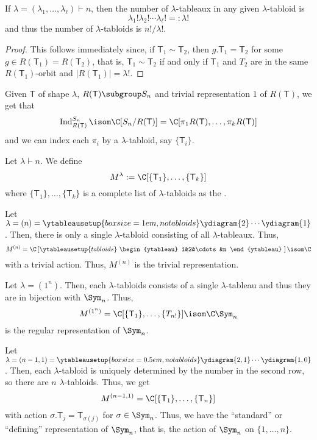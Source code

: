 \documentclass[11pt,leqno,oneside]{amsbook}
\newcommand{\Ind}{\operatorname{Ind}}
\newcommand{\partitionof}{\vdash}
\newcommand{\T}{\mathsf{T}} %
\numberwithin{thm}{section}
\begin{document}
\begin{prop}
  If \(\lambda = (\lambda_1, \ldots, \lambda_\ell) \partitionof n\), then the number of \(\lambda\)-tableaux in any
  given \(\lambda\)-tabloid is \[
    \lambda_1 ! \lambda_2 ! \cdots \lambda_\ell ! =: \lambda!
  \]
  and thus the number of \(\lambda\)-tabloids is \(n!/\lambda!\).
\end{prop}
\begin{proof}
  This follows immediately since, if \(\T_1 \sim \T_2\), then \(g.\T_1
  = \T_2\) for some \(g \in R(\T_1) = R(\T_2)\), that is, \(\T_1 \sim
  \T_2\) if and only if \(\T_1\) and \(T_2\) are in the same
  \(R(\T_1)\)-orbit and \(|R(\T_1)| = \lambda!\). 
\end{proof}
\begin{prop}
  Given \(\T\) of shape \(\lambda\), \(R(\T) \subgroup S_n\) and
  trivial representation \(1\) of 
  \(R(\T)\), we get that \[ 
    \Ind_{R(\T)}^{S_n} \isom \C[S_n/R(\T)] = \C[\pi_1 R(\T), \ldots,
    \pi_k R(\T)]
  \]
  and we can index each \(\pi_i\) by a \(\lambda\)-tabloid, say
  \(\{\T_i\}\).
\end{prop}
\begin{defn}
  Let \(\lambda \partitionof n\). We define \[
    M^\lambda := \C[\{\T_1\}, \ldots, \{\T_k\}]
  \]
  where \(\{\T_1\}, \ldots, \{\T_k\}\) is a complete list of
  \(\lambda\)-tabloids as the .
\end{defn}
\begin{example}
  Let \(\lambda = (n) = \ytableausetup{boxsize=1em,
    notabloids}\ydiagram{2} \cdots \ydiagram{1}\). Then, there is only
  a single \(\lambda\)-tabloid consisting of all
  \(\lambda\)-tableaux. Thus, \[
    M^{(n)} = \C\left[\ytableausetup{tabloids}
    \ \begin{ytableau}
      1&2&\cdots&n
    \end{ytableau}
    \ \right] \isom \C
  \]
  with a trivial action. Thus, \(M^{(n)}\) is the trivial representation.
\end{example}
\begin{example}
  Let \(\lambda = (1^n)\). Then, each \(\lambda\)-tabloids consists of
  a single \(\lambda\)-tableau and thus they are in bijection with
  \(\Sym_n\). Thus, \[
    M^{(1^n)} = \C[\{\T_1\}, \ldots, \{T_{n!}\}] \isom \C \Sym_n
  \]
  is the regular representation of \(\Sym_n\).
\end{example}
\begin{example}
  Let \(\lambda = (n-1, 1) = \ytableausetup{boxsize=0.5em, notabloids}
  \ydiagram{2,1} \cdots \ydiagram{1,0}
  \). Then, each \(\lambda\)-tabloid is uniquely determined by the
  number in the second row, so there are \(n\)
  \(\lambda\)-tabloids. Thus, we get \[
    M^{(n-1,1)} = \C[\{\T_1\}, \ldots, \{\T_n\}]
  \]
  with action \(\sigma.\T_j = \T_{\sigma(j)}\) for \(\sigma \in
  \Sym_n\). Thus, we have the ``standard'' or ``defining''
  representation of \(\Sym_n\), that is, the action of \(\Sym_n\) on
  \(\{1,\ldots,n\}\).
\end{example}
\end{document}

